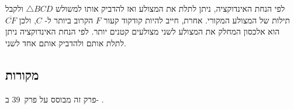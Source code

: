 לפי הנחת האינדוקציה, ניתן לתלת את המצולע ואז להדביק אותו למשולש
$\triangle BCD$
ולקבל תילות של המצולע המקורי. אחרת, חייב להיות קודקוד קעור
$F$
הקרוב ביותר ל-%
$C$,
ולכן
$\overline{CF}$
הוא אלכסון המחלק את המצולע לשני מצולעים קטנים יותר. לפי הנחת האינדוקציה ניתן לתלת אותם ולהדביק אותם אחד לשני.
%

\subsection*{מקורות}

פרק זה מבוסס על פרק~$39$ ב-%
\cite{thebook}.
